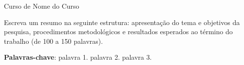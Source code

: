 \documentclass[
    12pt,
    a4paper,
    oneside,
    chapter=TITLE,
    section=TITLE,
    subsection=TITLE
]{abntex2}
\newcommand{\curso}{Nome do Curso}
\begin{document}
\pretextual
\pagestyle{abntchapfirst}

\begin{capa}
  \thispagestyle{empty}
  \center
  \large\imprimirinstituicao

  \large Curso de \curso
  \vspace{2cm}

  \large\imprimirautor

  \vfill
  \begin{center}
    \bfseries\LARGE\imprimirtitulo
  \end{center}
  \vfill

  \bfseries\large\imprimirlocal

  \bfseries\large\imprimirdata
  \vspace*{1cm}
\end{capa}

\setcounter{page}{2}

\imprimirfolhaderostostar

\tableofcontents*
\clearpage

\begin{resumo}
  Escreva um resumo na seguinte estrutura: apresentação do tema e
  objetivos da pesquisa, procedimentos metodológicos e resultados
  esperados ao término do trabalho (de 100 a 150 palavras).

  \vspace{\onelineskip}
  \noindent
  \textbf{Palavras-chave}: palavra 1. palavra 2. palavra 3.
\end{resumo}
\clearpage

\textual
\pagestyle{abntchapfirst}
\end{document}
